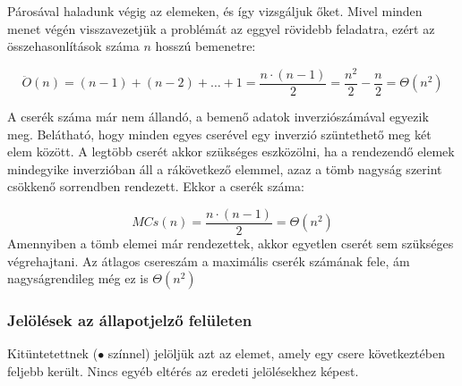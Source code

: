 \documentclass{elteikthesis}
\newcommand{\hiddensubsubsection}[1]{
	\stepcounter{subsubsection}
	\subsubsection*{{#1}}	
}
\begin{document}
Párosával haladunk végig az elemeken, és így vizsgáljuk őket. Mivel minden menet végén visszavezetjük a problémát az eggyel rövidebb feladatra, ezért az összehasonlítások száma $n$ hosszú bemenetre:\par
$$\ddot{O}(n)=(n-1)+(n-2)+\ldots+1=\frac{n\cdot(n-1)}{2}=\frac{n^2}{2}-\frac{n}{2}=\Theta(n^2)$$
\par A cserék száma már nem állandó, a bemenő adatok inverziószámával egyezik meg. Belátható, hogy minden egyes cserével egy inverzió szüntethető meg két elem között. A legtöbb cserét akkor szükséges eszközölni, ha a rendezendő elemek mindegyike inverzióban áll a rákövetkező elemmel, azaz a tömb nagyság szerint csökkenő sorrendben rendezett. Ekkor a cserék száma:\par
$$MCs(n)=\frac{n\cdot(n-1)}{2}=\Theta(n^2)$$
Amennyiben a tömb elemei már rendezettek, akkor egyetlen cserét sem szükséges végrehajtani.
Az átlagos csereszám a maximális cserék számának fele\cite{Fekete}, ám nagyságrendileg még ez is $\Theta(n^2)$
\hiddensubsubsection{Jelölések az állapotjelző felületen}
Kitüntetettnek (\textcolor{select}{\Huge$\bullet$} színnel) jelöljük azt az elemet, amely egy csere következtében feljebb került. Nincs egyéb eltérés az eredeti jelölésekhez képest.
\end{document}
